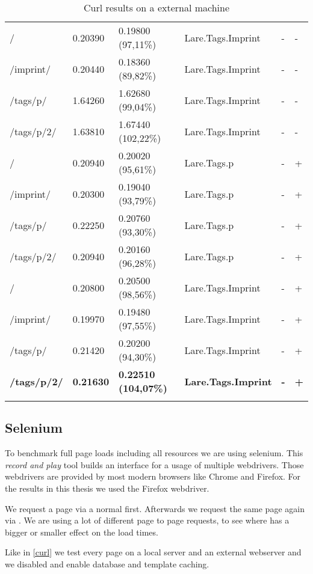 \begin{center}
\begin{longtable}{llllll}
	\hline
	/ & 0.20390 & 0.19800 (97,11\%) & Lare.Tags.Imprint & - & - \\
	/imprint/ & 0.20440 & 0.18360 (89,82\%) & Lare.Tags.Imprint & - & - \\
	/tags/p/ & 1.64260 & 1.62680 (99,04\%) & Lare.Tags.Imprint & - & - \\
	/tags/p/2/ & 1.63810 & 1.67440 (102,22\%) & Lare.Tags.Imprint & - & - \\
	\hline
	\hline
	/ & 0.20940 & 0.20020 (95,61\%) & Lare.Tags.p & - & + \\
	/imprint/ & 0.20300 & 0.19040 (93,79\%) & Lare.Tags.p & - & + \\
	/tags/p/ & 0.22250 & 0.20760 (93,30\%) & Lare.Tags.p & - & + \\
	/tags/p/2/ & 0.20940 & 0.20160 (96,28\%) & Lare.Tags.p & - & + \\
	\hline
	/ & 0.20800 & 0.20500 (98,56\%) & Lare.Tags.Imprint & - & + \\
	/imprint/ & 0.19970 & 0.19480 (97,55\%) & Lare.Tags.Imprint & - & + \\
	/tags/p/ & 0.21420 & 0.20200 (94,30\%) & Lare.Tags.Imprint & - & + \\
	\textbf{/tags/p/2/} & \textbf{0.21630} & \textbf{0.22510 (104,07\%)} & \textbf{Lare.Tags.Imprint} & \textbf{-} & \textbf{+} \\
	\hline
\caption{Curl results on a external machine}
\label{tab:curl_results_external}
\end{longtable}
\end{center}

\subsection{Selenium}

To benchmark full page loads including all resources we are using selenium.
This \emph{record and play} tool builds an interface for a usage of multiple webdrivers.
Those webdrivers are provided by most modern browsers like Chrome and Firefox.
For the results in this thesis we used the Firefox webdriver.

We request a page via a normal \httpRequest{} first.
Afterwards we request the same page again via \lare{}.
We are using a lot of different page to page requests, to see where \lare{} has a bigger or smaller effect on the load times.

Like in \ref{curl} we test every page on a local server and an external webserver and we disabled and enable database and template caching.

